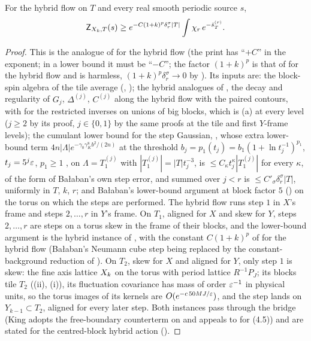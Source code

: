 
\begin{proposition}\label{rot:prop:H4}
For the hybrid flow on $T$ and every real smooth periodic source $s$,
\[
\mathsf Z_{X_k,T}(s)\ge e^{-C(1+k)^p\delta_r^\sigma|T|}\int\chi_r\,e^{-\hat s^{(r)}_T}.
\]
\end{proposition}
\begin{proof}
This is the analogue of \cite[Prop.~4.1, (4.5)]{K2} for the hybrid flow (the print has ``$+C$'' in the exponent; in a lower bound it must be ``$-C$''; the factor $(1+k)^p$ is that of  for the hybrid flow and is harmless, $(1+k)^p\delta_r^\sigma\to0$ by ). Its inputs are: the block-spin algebra of the tile average (, ); the hybrid analogues of \cite[Props.~2.1--2.3]{Ba1}, the decay and regularity of $G_j$, $\Delta^{(j)}$, $C^{(j)}$ along the hybrid flow with the paired contours, with \cite[Prop.~5.6]{K2} for the restricted inverses on unions of big blocks, which is (a) at every level ($j\ge2$ by its proof, $j\in\{0,1\}$ by the same proofs at the tile and first $Y$-frame levels); the cumulant lower bound for the step Gaussian, , whose extra lower-bound term $4n|\Lambda|e^{-\gamma_0\gamma_K^8b^2/(2n)}$ at the threshold $b_j=p_1(t_j)=b_1(1+\ln t_j^{-1})^{p_1}$, $t_j=5^j\varepsilon$, $p_1\ge1$ \cite[(3.43), (3.50)]{Ba1}, on $\Lambda=T^{(j)}_1$ with $|T^{(j)}_1|=|T|t_j^{-3}$, is $\le C_\kappa t_j^\kappa|T^{(j)}_1|$ for every $\kappa$, of the form of Ba{\l}aban's own step error, and summed over $j<r$ is $\le C'_\sigma\delta_r^\sigma|T|$, uniformly in $T$, $k$, $r$; and Ba{\l}aban's lower-bound argument \cite[\S\S3--4]{Ba1} at block factor $5$ () on the torus on which the steps are performed. The hybrid flow runs step $1$ in $X$'s frame and steps $2,\dots,r$ in $Y$'s frame. On $T_1$, aligned for $X$ and skew for $Y$, steps $2,\dots,r$ are steps on a torus skew in the frame of their blocks, and the lower-bound argument is the hybrid instance of , with the constant $C(1+k)^p$ of  for the hybrid flow (Ba{\l}aban's Neumann cube step being replaced by the constant-background reduction of ). On $T_2$, skew for $X$ and aligned for $Y$, only step $1$ is skew: the fine axis lattice $X_k$ on the torus with period lattice $R^{-1}P_J$; its blocks tile $T_2$ ((ii), (i)), its fluctuation covariance has mass of order $\varepsilon^{-1}$ in physical units, so the torus images of its kernels are $O(e^{-c\,50MJ/\varepsilon})$, and the step lands on $Y_{k-1}\subset T_2$, aligned for every later step. Both instances pass through the bridge  (King adopts the free-boundary counterterm on \cite[p.~330]{K2} and appeals to \cite{Ba1} for (4.5)) and are stated for the centred-block hybrid action ().
\end{proof}

